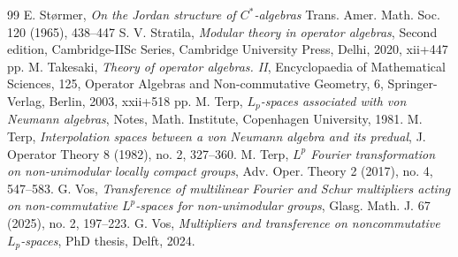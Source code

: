 \documentclass[12pt]{amsart}
\theoremstyle{remark}
\theoremstyle{definition}
\numberwithin{equation}{section}
\begin{document}
\begin{thebibliography}{99}
 E. St\o{}rmer, {\it On the Jordan structure of $C^*$-algebras}
Trans. Amer. Math. Soc. 120 (1965), 438–447
 S. V. Stratila, {\it Modular theory in operator algebras},
Second edition, Cambridge-IISc Series, Cambridge University Press, Delhi, 2020, xii+447 pp.
 M. Takesaki, {\it Theory of operator algebras. II}, Encyclopaedia of Mathematical Sciences, 125, 
Operator Algebras and Non-commutative Geometry, 6, Springer-Verlag, Berlin, 2003, xxii+518 pp.
 M. Terp, {\it $L_p$-spaces associated with von Neumann algebras}, Notes, Math. Institute, Copenhagen University, 1981.
  M. Terp, {\it Interpolation spaces between a von Neumann algebra and its predual}, 
J. Operator Theory 8 (1982), no. 2, 327–360.
  M. Terp, {\it $L^p$ Fourier transformation on non-unimodular locally compact groups}, 
Adv. Oper. Theory 2 (2017), no. 4, 547–583. 
 G. Vos,
{\it Transference of multilinear Fourier and Schur multipliers acting on non-commutative    
$L^p$-spaces for non-unimodular groups}, Glasg. Math. J. 67 (2025), no. 2, 197–223.
 G. Vos, {\it Multipliers and transference on noncommutative $L_p$-spaces}, PhD thesis, Delft, 2024.
\end{thebibliography}
\end{document}
